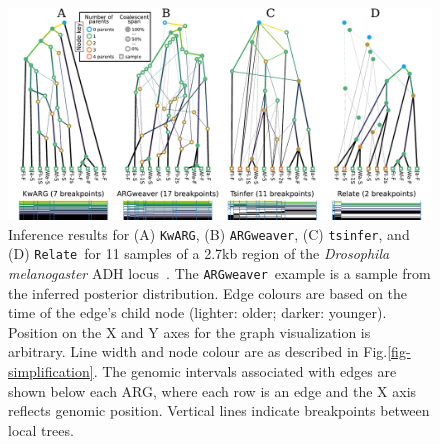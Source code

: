 \documentclass{article}
\newcommand{\tsinfer}[0]{\texttt{tsinfer}}
\newcommand{\kwarg}[0]{\texttt{KwARG}}
\newcommand{\argweaver}[0]{\texttt{ARGweaver}}
\newcommand{\relate}[0]{\texttt{Relate}}
\begin{document}

\begin{figure} \begin{center}
\includegraphics[width=\textwidth]{illustrations/inference.pdf} \end{center}
\caption{\label{fig-inferred-args} Inference results for
(A) \kwarg, (B) \argweaver, (C) \tsinfer,
and (D) \relate\
for 11 samples of a 2.7kb region of the \textit{Drosophila melanogaster} ADH
locus~\citep{kreitman1983nucleotide}.
The \argweaver\ example
is a sample from the inferred posterior distribution.
Edge colours are based on the time of the edge's child node
(lighter: older; darker: younger).
Position on the X and Y axes for the graph visualization is arbitrary.
Line width and node colour are as described in Fig.\ref{fig-simplification}.
The genomic intervals associated with edges are shown below
each ARG, where each row is an edge
and the X axis reflects genomic position.
Vertical lines indicate breakpoints between local trees.
}
\end{figure}
\end{document}
